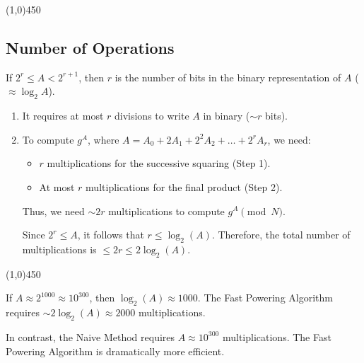 \begin{center}
    \vspace{10pt}
    \line(1,0){450}
    \vspace{10pt}
\end{center}

\subsection*{Number of Operations}

\begin{remark}
\par
If $2^r \le A < 2^{r+1}$, then $r$ is the number of bits in the binary representation of $A$ ($\approx \log_2 A$).
\begin{enumerate}
    \item It requires at most $r$ divisions to write $A$ in binary ($\sim r$ bits).
    \item To compute $g^A$, where $A = A_0 + 2A_1 + 2^2A_2 + \dots + 2^rA_r$, we need:
    \begin{itemize}
        \item $r$ multiplications for the successive squaring (Step 1).
        \item At most $r$ multiplications for the final product (Step 2).
    \end{itemize}
    \par
    Thus, we need $\sim 2r$ multiplications to compute $g^A \pmod{N}$.
    \par
    Since $2^r \le A$, it follows that $r \le \log_2(A)$. Therefore, the total number of multiplications is $\le 2r \le 2 \log_2(A)$.
\end{enumerate}
\end{remark}

\begin{center}
    \vspace{10pt}
    \line(1,0){450}
    \vspace{25pt}
\end{center}

\begin{proposition}
\par
If $A \approx 2^{1000} \approx 10^{300}$, then $\log_2(A) \approx 1000$.
The Fast Powering Algorithm requires $\sim 2 \log_2(A) \approx 2000$ multiplications.
\par
In contrast, the Naive Method requires $A \approx 10^{300}$ multiplications. The Fast Powering Algorithm is dramatically more efficient.
\end{proposition}

